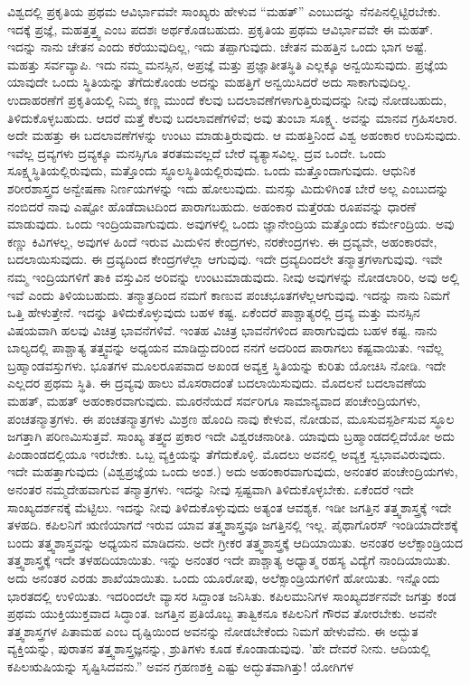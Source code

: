 ವಿಶ್ವದಲ್ಲಿ ಪ್ರಕೃತಿಯ ಪ್ರಥಮ ಆವಿರ್ಭಾವವೇ ಸಾಂಖ್ಯರು ಹೇಳುವ “ಮಹತ್'' ಎಂಬುದನ್ನು ನೆನಪಿನಲ್ಲಿಟ್ಟಿರಬೇಕು. ಇದಕ್ಕೆ ಪ್ರಜ್ಞೆ, ಮಹತ್ತತ್ತ್ವ ಎಂಬ ಪದಶಃ ಅರ್ಥಕೊಡಬಹುದು. ಪ್ರಕೃತಿಯ ಪ್ರಥಮ ಆವಿರ್ಭಾವವೇ ಈ ಮಹತ್. ಇದನ್ನು ನಾನು ಚೇತನ ಎಂದು ಕರೆಯುವುದಿಲ್ಲ, ಇದು ತಪ್ಪಾಗುವುದು. ಚೇತನ ಮಹತ್ತಿನ ಒಂದು ಭಾಗ ಅಷ್ಟೆ. ಮಹತ್ತು ಸರ್ವವ್ಯಾಪಿ. ಇದು ನಮ್ಮ ಮನಸ್ಸಿನ, ಅಪ್ರಜ್ಞೆ ಮತ್ತು ಪ್ರಜ್ಞಾತೀತಸ್ಥಿತಿ ಎಲ್ಲಕ್ಕೂ ಅನ್ವಯಿಸುವುದು. ಪ್ರಜ್ಞೆಯ ಯಾವುದೇ ಒಂದು ಸ್ಥಿತಿಯನ್ನು ತೆಗೆದುಕೊಂಡು ಅದನ್ನು ಮಹತ್ತಿಗೆ ಅನ್ವಯಿಸಿದರೆ ಅದು ಸಾಕಾಗುವುದಿಲ್ಲ. ಉದಾಹರಣೆಗೆ ಪ್ರಕೃತಿಯಲ್ಲಿ ನಿಮ್ಮ ಕಣ್ಣ ಮುಂದೆ ಕೆಲವು ಬದಲಾವಣೆಗಳಾಗುತ್ತಿರುವುದನ್ನು ನೀವು ನೋಡಬಹುದು, ತಿಳಿದುಕೊಳ್ಳಬಹುದು. ಆದರೆ ಮತ್ತೆ ಕೆಲವು ಬದಲಾವಣೆಗಳಿವೆ; ಅವು ತುಂಬಾ ಸೂಕ್ಷ್ಮ. ಅವನ್ನು ಮಾನವ ಗ್ರಹಿಸಲಾರ. ಅದೇ ಮಹತ್ತು ಈ ಬದಲಾವಣೆಗಳನ್ನು ಉಂಟು ಮಾಡುತ್ತಿರುವುದು. ಆ ಮಹತ್ತಿನಿಂದ ವಿಶ್ವ ಅಹಂಕಾರ ಉದಿಸುವುದು. ಇವೆಲ್ಲ ದ್ರವ್ಯಗಳು ದ್ರವ್ಯಕ್ಕೂ ಮನಸ್ಸಿಗೂ ತರತಮವಲ್ಲದೆ ಬೇರೆ ವ್ಯತ್ಯಾಸವಿಲ್ಲ. ದ್ರವ ಒಂದೇ. ಒಂದು ಸೂಕ್ಷ್ಮಸ್ಥಿತಿಯಲ್ಲಿರುವುದು, ಮತ್ತೊಂದು ಸ್ಥೂಲಸ್ಥಿತಿಯಲ್ಲಿರುವುದು. ಒಂದು ಮತ್ತೊಂದಾಗುವುದು. ಆಧುನಿಕ ಶರೀರಶಾಸ್ತ್ರದ ಅನ್ವೇಷಣಾ ನಿರ್ಣಯಗಳನ್ನು ಇದು ಹೋಲುವುದು. ಮನಸ್ಸು ಮಿದುಳಿಗಿಂತ ಬೇರೆ ಅಲ್ಲ ಎಂಬುದನ್ನು ನಂಬಿದರೆ ನಾವು ಎಷ್ಟೋ ಹೊಡೆದಾಟದಿಂದ ಪಾರಾಗಬಹುದು. ಅಹಂಕಾರ ಮತ್ತೆರಡು ರೂಪವನ್ನು ಧಾರಣೆ ಮಾಡುವುದು. ಒಂದು ಇಂದ್ರಿಯವಾಗುವುದು. ಅವುಗಳಲ್ಲಿ ಒಂದು ಜ್ಞಾನೇಂದ್ರಿಯ ಮತ್ತೊಂದು ಕರ್ಮೇಂದ್ರಿಯ. ಅವು ಕಣ್ಣು ಕಿವಿಗಳಲ್ಲ, ಅವುಗಳ ಹಿಂದೆ ಇರುವ ಮಿದುಳಿನ ಕೇಂದ್ರಗಳು, ನರಕೇಂದ್ರಗಳು. ಈ ದ್ರವ್ಯವೇ, ಅಹಂಕಾರವೇ, ಬದಲಾಯಿಸುವುದು. ಈ ದ್ರವ್ಯದಿಂದ ಕೇಂದ್ರಗಳೆಲ್ಲಾ ಆಗುವುವು. ಇದೇ ದ್ರವ್ಯದಿಂದಲೇ ತನ್ಮಾತ್ರಗಳಾಗುವುವು. ಇವೇ ನಮ್ಮ ಇಂದ್ರಿಯಗಳಿಗೆ ತಾಕಿ ವಸ್ತುವಿನ ಅರಿವನ್ನು ಉಂಟುಮಾಡುವುದು. ನೀವು ಅವುಗಳನ್ನು ನೋಡಲಾರಿರಿ, ಅವು ಅಲ್ಲಿ ಇವೆ ಎಂದು ತಿಳಿಯಬಹುದು. ತನ್ಮಾತ್ರದಿಂದ ನಮಗೆ ಕಾಣುವ ಪಂಚಭೂತಗಳೆಲ್ಲ\break ಆಗುವುವು. ಇದನ್ನು ನಾನು ನಿಮಗೆ ಒತ್ತಿ ಹೇಳುತ್ತೇನೆ. ಇದನ್ನು ತಿಳಿದುಕೊಳ್ಳುವುದು ಬಹಳ ಕಷ್ಟ. ಏಕೆಂದರೆ ಪಾಶ್ಚಾತ್ಯರಲ್ಲಿ ದ್ರವ್ಯ ಮತ್ತು ಮನಸ್ಸಿನ ವಿಷಯವಾಗಿ ಹಲವು ವಿಚಿತ್ರ ಭಾವನೆಗಳಿವೆ. ಇಂತಹ ವಿಚಿತ್ರ ಭಾವನೆಗಳಿಂದ ಪಾರಾಗುವುದು ಬಹಳ ಕಷ್ಟ. ನಾನು ಬಾಲ್ಯದಲ್ಲಿ ಪಾಶ್ಚಾತ್ಯ ತತ್ತ್ವವನ್ನು ಅಧ್ಯಯನ ಮಾಡಿದ್ದುದರಿಂದ ನನಗೆ ಅದರಿಂದ ಪಾರಾಗಲು ಕಷ್ಟವಾಯಿತು. ಇವೆಲ್ಲ ಬ್ರಹ್ಮಾಂಡವಸ್ತುಗಳು. ಭೂತಗಳ ಮೂಲರೂಪವಾದ ಅಖಂಡ ಅವ್ಯಕ್ತ ಸ್ಥಿತಿಯನ್ನು ಕುರಿತು ಯೋಚಿಸಿ ನೋಡಿ. ಇದೇ ಎಲ್ಲದರ ಪ್ರಥಮ ಸ್ಥಿತಿ. ಈ ದ್ರವ್ಯವು ಹಾಲು ಮೊಸರಾದಂತೆ ಬದಲಾಯಿಸುವುದು. ಮೊದಲನೆ ಬದಲಾವಣೆಯ ಮಹತ್, ಮಹತ್ ಅಹಂಕಾರವಾಗುವುದು. ಮೂರನೆಯದೆ ಸರ್ವರಿಗೂ ಸಾಮಾನ್ಯವಾದ ಪಂಚೇಂದ್ರಿಯಗಳು, ಪಂಚತನ್ಮಾತ್ರಗಳು. ಈ ಪಂಚತನ್ಮಾತ್ರಗಳು ಮಿಶ್ರಣ ಹೊಂದಿ ನಾವು ಕೇಳುವ, ನೋಡುವ, ಮೂಸುವ\break ಸ್ಪರ್ಶಿಸುವ ಸ್ಥೂಲ ಜಗತ್ತಾಗಿ ಪರಿಣಮಿಸುತ್ತವೆ. ಸಾಂಖ್ಯ ತತ್ತ್ವದ ಪ್ರಕಾರ ಇದೇ ವಿಶ್ವರಚನಾರೀತಿ. ಯಾವುದು ಬ್ರಹ್ಮಾಂಡದಲ್ಲಿದೆಯೋ ಅದು ಪಿಂಡಾಂಡದಲ್ಲಿಯೂ ಇರಬೇಕು. ಒಬ್ಬ ವ್ಯಕ್ತಿಯನ್ನು ತೆಗೆದುಕೊಳ್ಳಿ. ಮೊದಲು ಅವನಲ್ಲಿ ಅವ್ಯಕ್ತ ಸ್ವಭಾವವಿರುವುದು. ಇದೇ ಮಹತ್ತಾಗುವುದು (ವಿಶ್ವಪ್ರಜ್ಞೆಯ ಒಂದು ಅಂಶ.) ಅದು ಅಹಂಕಾರವಾಗುವುದು, ಅನಂತರ ಪಂಚೇಂದ್ರಿಯಗಳು, ಅನಂತರ ನಮ್ಮದೇಹವಾಗುವ ತನ್ಮಾತ್ರಗಳು. ಇದನ್ನು ನೀವು ಸ್ಪಷ್ಟವಾಗಿ ತಿಳಿದುಕೊಳ್ಳಬೇಕು. ಏಕೆಂದರೆ ಇದೇ ಸಾಂಖ್ಯದರ್ಶನಕ್ಕೆ ಮೆಟ್ಟಿಲು. ಇದನ್ನು ನೀವು ತಿಳಿದುಕೊಳ್ಳುವುದು ಅತ್ಯಂತ ಆವಶ್ಯಕ. ಇಡೀ ಜಗತ್ತಿನ ತತ್ತ್ವಶಾಸ್ತ್ರಕ್ಕೆ ಇದೇ ತಳಹದಿ. ಕಪಿಲನಿಗೆ ಋಣಿಯಾಗದೆ ಇರುವ ಯಾವ ತತ್ತ್ವಶಾಸ್ತ್ರವೂ ಜಗತ್ತಿನಲ್ಲಿ ಇಲ್ಲ. ಪೈಥಾಗೊರಸ್ ಇಂಡಿಯಾದೇಶಕ್ಕೆ ಬಂದು ತತ್ತ್ವಶಾಸ್ತ್ರವನ್ನು ಅಧ್ಯಯನ ಮಾಡಿದನು. ಅದೇ ಗ್ರೀಕರ ತತ್ತ್ವಶಾಸ್ತ್ರಕ್ಕೆ ಆದಿಯಾಯಿತು. ಅನಂತರ ಅಲೆಕ್ಸಾಂಡ್ರಿಯದ ತತ್ತ್ವಶಾಸ್ತ್ರಕ್ಕೆ ಇದೇ ತಳಹದಿಯಾಯಿತು. ಇನ್ನು ಅನಂತರ ಇದೇ ಪಾಶ್ಚಾತ್ಯ ಅಧ್ಯಾತ್ಮ ರಹಸ್ಯ ವಿದ್ಯೆಗೆ ನಾಂದಿಯಾಯಿತು. ಅದು ಅನಂತರ ಎರಡು ಶಾಖೆಯಾಯಿತು. ಒಂದು ಯೂರೋಪು, ಅಲೆಕ್ಸಾಂಡ್ರಿಯಗಳಿಗೆ ಹೋಯಿತು. ಇನ್ನೊಂದು ಭಾರತದಲ್ಲಿ ಉಳಿಯಿತು. ಇದರಿಂದಲೇ ವ್ಯಾಸರ ಸಿದ್ದಾಂತ ಜನಿಸಿತು. ಕಪಿಲಮುನಿಗಳ ಸಾಂಖ್ಯದರ್ಶನವೇ ಜಗತ್ತು ಕಂಡ ಪ್ರಥಮ ಯುಕ್ತಿಯುಕ್ತವಾದ ಸಿದ್ಧಾಂತ. ಜಗತ್ತಿನ ಪ್ರತಿಯೊಬ್ಬ ತಾತ್ವಿಕನೂ ಕಪಿಲನಿಗೆ ಗೌರವ ತೋರಬೇಕು. ಅವನೇ ತತ್ತ್ವಶಾಸ್ತ್ರಗಳ ಪಿತಾಮಹ ಎಂಬ ದೃಷ್ಟಿಯಿಂದ ಅವನನ್ನು ನೋಡಬೇಕೆಂದು ನಿಮಗೆ ಹೇಳುವೆನು. ಈ ಅದ್ಭುತ ವ್ಯಕ್ತಿಯನ್ನು, ಪುರಾತನ ತತ್ತ್ವಶಾಸ್ತ್ರಜ್ಞನನ್ನು, ಶ್ರುತಿಗಳು ಕೂಡ ಕೊಂಡಾಡುವುವು. 'ಹೇ ದೇವರೆ ನೀನು. ಆದಿಯಲ್ಲಿ ಕಪಿಲಋಷಿಯನ್ನು ಸೃಷ್ಟಿಸಿದವನು.'' ಅವನ ಗ್ರಹಣಶಕ್ತಿ ಎಷ್ಟು ಅದ್ಭುತವಾಗಿತ್ತು! ಯೋಗಿಗಳ 